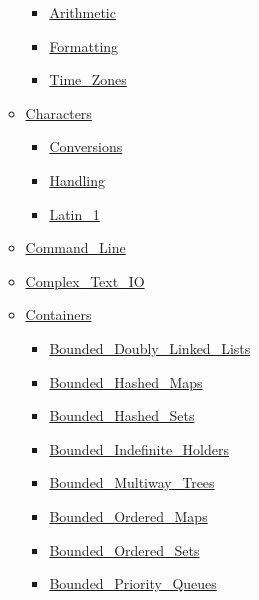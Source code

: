 \documentclass[english]{article}
\begin{document}
\begin{scriptsize}
\begin{multicols*}{5}
\begin{itemize}[leftmargin=0mm]
\begin{itemize}[leftmargin=5mm]
	\begin{itemize}[leftmargin=5mm]
	\item[] \href{http://www.ada-auth.org/standards/22rm/html/RM-9-6-1.html}{Arithmetic}
	\item[] \href{http://www.ada-auth.org/standards/22rm/html/RM-9-6-1.html}{Formatting}
	\item[] \href{http://www.ada-auth.org/standards/22rm/html/RM-9-6-1.html}{Time\_Zones}
	\end{itemize}
  \item[] \href{http://www.ada-auth.org/standards/22rm/html/RM-A-3-1.html}{Characters}
	\begin{itemize}[leftmargin=5mm]
	\item[] \href{http://www.ada-auth.org/standards/22rm/html/RM-A-3-4.html}{Conversions}
	\item[] \href{http://www.ada-auth.org/standards/22rm/html/RM-A-3-2.html}{Handling}
	\item[] \href{http://www.ada-auth.org/standards/22rm/html/RM-A-3-3.html}{Latin\_1}
	\end{itemize}
  \item[] \href{http://www.ada-auth.org/standards/22rm/html/RM-A-15.html}{Command\_Line}
  \item[] \href{http://www.ada-auth.org/standards/22rm/html/RM-G-1-3.html}{Complex\_Text\_IO}
  \item[] \href{http://www.ada-auth.org/standards/22rm/html/RM-A-18-1.html}{Containers}
	\begin{itemize}[leftmargin=5mm]
	\item[] \href{http://www.ada-auth.org/standards/22rm/html/RM-A-18-20.html}{Bounded\_Doubly\_Linked\_Lists}
	\item[] \href{http://www.ada-auth.org/standards/22rm/html/RM-A-18-21.html}{Bounded\_Hashed\_Maps}
	\item[] \href{http://www.ada-auth.org/standards/22rm/html/RM-A-18-23.html}{Bounded\_Hashed\_Sets}
	\item[] \href{http://www.ada-auth.org/standards/22rm/html/RM-A-18-32.html}{Bounded\_Indefinite\_Holders}
	\item[] \href{http://www.ada-auth.org/standards/22rm/html/RM-A-18-25.html}{Bounded\_Multiway\_Trees}
	\item[] \href{http://www.ada-auth.org/standards/22rm/html/RM-A-18-22.html}{Bounded\_Ordered\_Maps}
	\item[] \href{http://www.ada-auth.org/standards/22rm/html/RM-A-18-24.html}{Bounded\_Ordered\_Sets}
	\item[] \href{http://www.ada-auth.org/standards/22rm/html/RM-A-18-31.html}{Bounded\_Priority\_Queues}

\end{itemize}
\end{itemize}
\end{itemize}
\end{multicols*}
\end{scriptsize}
\end{document}
